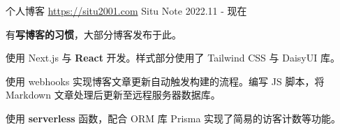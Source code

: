 
\begin{cventries}



    \cventry
    {个人博客 \href{https://situ2001.com}{https://situ2001.com}} %
    {Situ Note} %
    {} %
    {2022.11 - 现在} %
    {
        \begin{cvitems} %
            \item {有\textbf{写博客的习惯}，大部分博客发布于此。}
            \item {使用 Next.js 与 \textbf{React} 开发。样式部分使用了 Tailwind CSS 与 DaisyUI 库。}
            \item {使用 webhooks 实现博客文章更新自动触发构建的流程。编写 JS 脚本，将 Markdown 文章处理后更新至远程服务器数据库。}
            \item {使用 \textbf{serverless} 函数，配合 ORM 库 Prisma 实现了简易的访客计数等功能。}
        \end{cvitems}
    }

\end{cventries}
